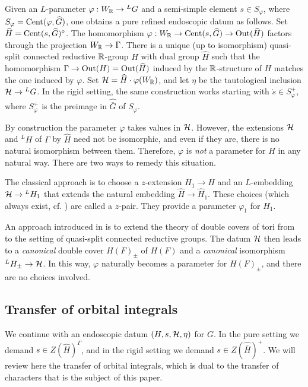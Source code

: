\documentclass{article}
\theoremstyle{definition}
\numberwithin{equation}{section}
\renewcommand{\-}{\hyp{}}
\begin{document}
Given an $L$\-parameter $\varphi : W_{\mathbb{R}} \to {^LG}$ and a semi-simple element $s \in S_\varphi$, where $S_\varphi=\textrm{Cent}(\varphi,\widehat G)$, one obtains a pure refined endoscopic datum as follows. Set $\widehat H = \textrm{Cent}(s,\widehat G)^\circ$. The homomorphism  $\varphi : W_{\mathbb{R}} \to \textrm{Cent}(s,\widehat G) \to \textrm{Out}(\widehat H)$ factors through the projection $W_{\mathbb{R}} \to \Gamma$. There is a unique (up to isomorphism) quasi-split connected reductive $\mathbb{R}$-group $H$ with dual group $\hat H$ such that the homomorphism $\Gamma \to \textrm{Out}(H)=\textrm{Out}(\widehat H)$ induced by the $\mathbb{R}$-structure of $H$ matches the one induced by $\varphi$. Set $\mathcal{H}=\widehat H \cdot \varphi(W_{\mathbb{R}})$, and let $\eta$ be the tautological inclusion $\mathcal{H} \to {^LG}$. In the rigid setting, the same construction works starting with $\dot s \in S_\varphi^+$, where $S_\varphi^+$ is the preimage in $\hat{\bar G}$ of $S_\varphi$.

By construction the parameter $\varphi$ takes values in $\mathcal{H}$. However, the extensions $\mathcal{H}$ and $^LH$ of $\Gamma$ by $\hat H$ need not be isomorphic, and even if they are, there is no natural isomorphism between them. Therefore, $\varphi$ is \emph{not} a parameter for $H$ in any natural way. There are two ways to remedy this situation.

The classical approach is to choose a $z$-extension $H_1 \to H$ and an $L$\-embedding $\mathcal{H} \to {^LH_1}$ that extends the natural embedding $\hat H \to \hat H_1$. These choices (which always exist, cf. \cite[\S2.2]{KS99}) are called a $z$-pair. They provide a parameter $\varphi_1$ for $H_1$.

An approach introduced in \cite{KalHDC} is to extend the theory of double covers of tori from \cite{KalDC} to the setting of quasi-split connected reductive groups. The datum $\mathcal{H}$ then leads to a \emph{canonical} double cover $H(F)_\pm$ of $H(F)$ and a \emph{canonical} isomorphism $^LH_\pm \to \mathcal{H}$. In this way, $\varphi$ naturally becomes a parameter for $H(F)_\pm$, and there are no choices involved.

\subsection{Transfer of orbital integrals} \label{sub:transfer}

We continue with an endoscopic datum $(H,s,\mathcal{H},\eta)$ for $G$. In the pure setting we demand $s \in Z(\hat H)^\Gamma$, and in the rigid setting we demand $s \in Z(\hat{\bar H})^+$. We will review here the transfer of orbital integrals, which is dual to the transfer of characters that is the subject of this paper.
\end{document}
